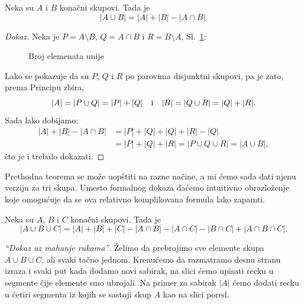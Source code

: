 \begin{THM}\label{ft06.thm.pui-2}
  Neka su $A$ i $B$ kona\v cni skupovi. Tada je
  $$
    |A \cup B| = |A| + |B| - |A \cap B|.
  $$
\end{THM}
\begin{proof}[Dokaz]
  Neka je $P = A \setminus B$, $Q = A \cap B$ i $R = B \setminus A$, Sl.~\ref{ft06.sl.kard-unije}:

\begin{figure}[!h]
  \centering
  
  \caption{Broj elemenata unije}
  \label{ft06.sl.kard-unije}
\end{figure}

  \noindent
  Lako se pokazuje da su $P$, $Q$ i $R$ po parovima disjunktni skupovi, pa je zato, prema Principu zbira,
  $$
    |A| = |P \cup Q| = |P| + |Q| \text{\quad i\quad} |B| = |Q \cup R| = |Q| + |R|.
  $$
  Sada lako dobijamo:
  \begin{align*}
    |A| + |B| - |A \cap B|
    &= |P| + |Q| + |Q| + |R| - |Q|\\
    &= |P| + |Q| + |R| = |P \cup Q \cup R| = |A \cup B|,
  \end{align*}
  \v sto je i trebalo dokazati.
\end{proof}

Prethodna teorema se mo\v ze uop\v stiti na razne na\v cine, a mi \'cemo sada dati njenu verziju za tri skupa.
Umesto formalnog dokaza da\'cemo intuitivno obrazlo\v zenje koje omogu\'cuje da se ova relativno komplikovana
formula lako zapamti.

\begin{THM}\label{ft06.thm.pui-3}
  Neka su $A$, $B$ i $C$ kona\v cni skupovi. Tada je
  $$
    |A \cup B \cup C| = |A| + |B| + |C| - |A \cap B| - |A \cap C| - |B \cap C| + |A \cap B \cap C|.
  $$
\end{THM}

\medskip

\noindent
\begin{minipage}{3in}
  \noindent\textit{\enquote{Dokaz uz mahanje rukama}}.
    \v Zelimo da prebrojimo sve elemente skupa $A \cup B \cup C$, ali svaki ta\v cno jednom.
    Krenu\'cemo da razmatramo desnu stranu izraza i svaki put kada dodamo novi sabirak, na slici \'cemo
    upisati recku u segmente \v cije elemente smo ubrojali. Na primer za sabirak $|A|$ \'cemo dodati
    recku u \v cetiri segmenta iz kojih se sastoji skup $A$ kao na slici pored.
\end{minipage}
\hfill
\begin{minipage}{2.5in}
  \begin{center}
    
  \end{center}
\end{minipage}

